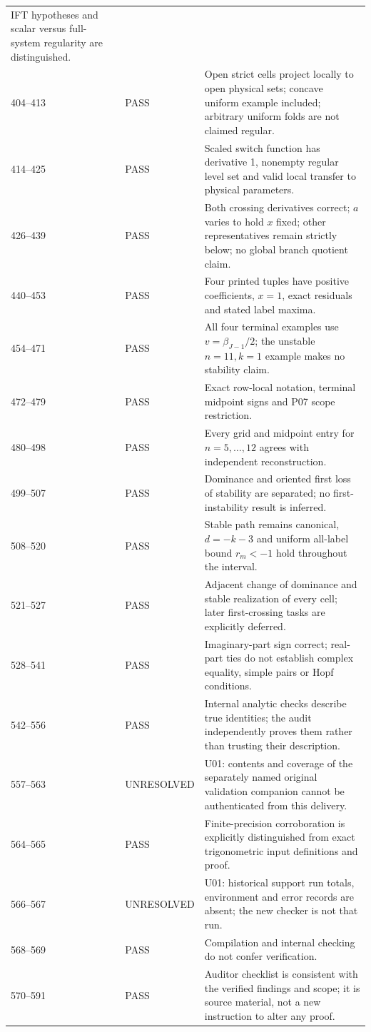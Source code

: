 \documentclass[11pt]{article}
\begin{document}
\begin{longtable}{@{}L{0.11\textwidth}L{0.18\textwidth}L{0.65\textwidth}@{}}
IFT hypotheses and scalar versus full-system regularity are distinguished.\\
404--413&PASS&Open strict cells project locally to open physical sets;
concave uniform example included; arbitrary uniform folds are not claimed regular.\\
414--425&PASS&Scaled switch function has derivative 1, nonempty regular
level set and valid local transfer to physical parameters.\\
426--439&PASS&Both crossing derivatives correct; $a$ varies to hold $x$
fixed; other representatives remain strictly below; no global branch quotient claim.\\
440--453&PASS&Four printed tuples have positive coefficients, $x=1$, exact
residuals and stated label maxima.\\
454--471&PASS&All four terminal examples use $v=\beta_{J-1}/2$;
the unstable $n=11,k=1$ example makes no stability claim.\\
472--479&PASS&Exact row-local notation, terminal midpoint signs and P07
scope restriction.\\
480--498&PASS&Every grid and midpoint entry for $n=5,\ldots,12$ agrees
with independent reconstruction.\\
499--507&PASS&Dominance and oriented first loss of stability are separated;
no first-instability result is inferred.\\
508--520&PASS&Stable path remains canonical, $d=-k-3$ and uniform
all-label bound $r_m<-1$ hold throughout the interval.\\
521--527&PASS&Adjacent change of dominance and stable realization of every
cell; later first-crossing tasks are explicitly deferred.\\
528--541&PASS&Imaginary-part sign correct; real-part ties do not establish
complex equality, simple pairs or Hopf conditions.\\
542--556&PASS&Internal analytic checks describe true identities; the
audit independently proves them rather than trusting their description.\\
557--563&UNRESOLVED&U01: contents and coverage of the separately named
original validation companion cannot be authenticated from this delivery.\\
564--565&PASS&Finite-precision corroboration is explicitly distinguished
from exact trigonometric input definitions and proof.\\
566--567&UNRESOLVED&U01: historical support run totals, environment and
error records are absent; the new checker is not that run.\\
568--569&PASS&Compilation and internal checking do not confer verification.\\
570--591&PASS&Auditor checklist is consistent with the verified findings and
scope; it is source material, not a new instruction to alter any proof.\\
\bottomrule
\end{longtable}
\end{document}
